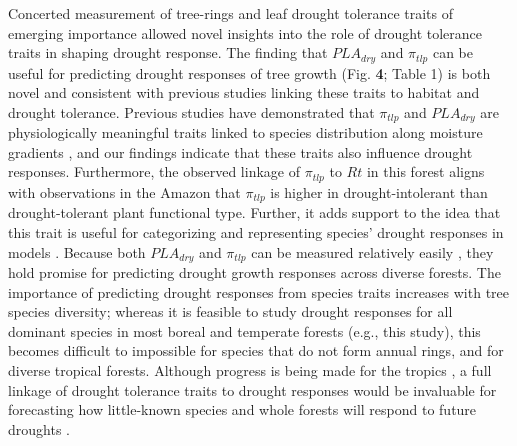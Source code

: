 \documentclass[
]{article}
\begin{document}
Concerted measurement of tree-rings and leaf drought tolerance traits of
emerging importance
\citep{scoffoni_leaf_2014, bartlett_correlations_2016, medeiros_extensive_2019}
allowed novel insights into the role of drought tolerance traits in
shaping drought response. The finding that \(PLA_{dry}\) and
\(\pi_{tlp}\) can be useful for predicting drought responses of tree
growth (Fig. \textbf{4}; Table 1) is both novel and consistent with
previous studies linking these traits to habitat and drought tolerance.
Previous studies have demonstrated that \(\pi_{tlp}\) and \(PLA_{dry}\)
are physiologically meaningful traits linked to species distribution
along moisture gradients
\citep{marechaux_drought_2015, fletcher_evolution_2018, medeiros_extensive_2019, simeone_coupled_2019, rosas_adjustments_2019, zhu_leaf_2018},
and our findings indicate that these traits also influence drought
responses. Furthermore, the observed linkage of \(\pi_{tlp}\) to \(Rt\)
in this forest aligns with observations in the Amazon that \(\pi_{tlp}\)
is higher in drought-intolerant than drought-tolerant plant functional
type. Further, it adds support to the idea that this trait is useful for
categorizing and representing species' drought responses in models
\citep{powell_differences_2017}. Because both \(PLA_{dry}\) and
\(\pi_{tlp}\) can be measured relatively easily
\citep{bartlett_rapid_2012, scoffoni_leaf_2014}, they hold promise for
predicting drought growth responses across diverse forests. The
importance of predicting drought responses from species traits increases
with tree species diversity; whereas it is feasible to study drought
responses for all dominant species in most boreal and temperate forests
(e.g., this study), this becomes difficult to impossible for species
that do not form annual rings, and for diverse tropical forests.
Although progress is being made for the tropics
\citep{schongart_dendroecological_2017}, a full linkage of drought
tolerance traits to drought responses would be invaluable for
forecasting how little-known species and whole forests will respond to
future droughts
\citep{christoffersen_linking_2016, powell_differences_2017}.
\end{document}
